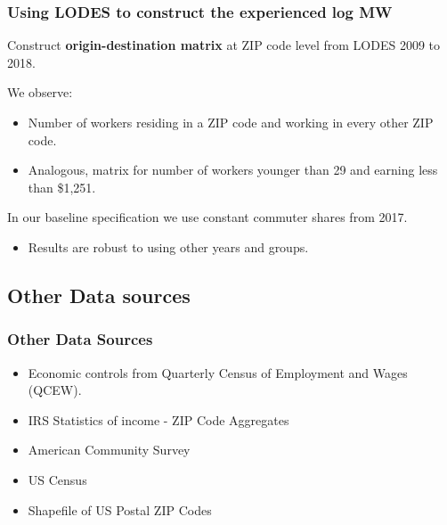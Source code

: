 \documentclass[aspectratio=169, t]{beamer}
\begin{document}
\begin{frame}
	\frametitle{Using LODES to construct the experienced log MW}
	
	\vspace{2mm}
	
	Construct \textbf{origin-destination matrix} at ZIP code level from LODES 2009 to 2018.
	
	\vspace{2mm}

	We observe:
	\begin{itemize} \small
		\item Number of workers residing in a ZIP code and working in every other 
		ZIP code.
		\item Analogous, matrix for number of workers younger than 29 and earning less than 
		\$1,251.
	\end{itemize}
	
	\vspace{2mm}	
	In our baseline specification we use constant commuter shares from 2017.
	\begin{itemize} \small
		\item Results are robust to using other years and groups.
	\end{itemize}
\end{frame}

\subsection{Other Data sources}

\begin{frame}
	\frametitle{Other Data Sources} 
	
	\begin{itemize}
		\item Economic controls from Quarterly Census of Employment and Wages 
		{\small (QCEW)}.
		\vspace{2mm} \item IRS Statistics of income - ZIP Code Aggregates
		\vspace{2mm} \item American Community Survey
		\vspace{2mm} \item US Census
		\vspace{2mm} \item Shapefile of US Postal ZIP Codes
	\end{itemize}
\end{frame}
\end{document}
